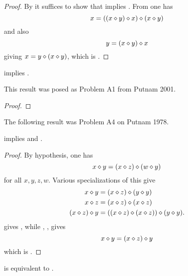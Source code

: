 \begin{proof}\leanok{} By  it suffices to show that  implies .  From  one has
  $$ x = ((x \diamond y) \diamond x) \diamond (x \diamond y)$$
  and also
  $$ y = (x \diamond y) \diamond x$$
  giving $x = y \diamond (x \diamond y)$, which is .
\end{proof}

\begin{theorem}[14 implies 29]\label{14_implies_29} \leanok  {} implies .
\end{theorem}

This result was posed as Problem A1 from Putnam 2001.

\begin{proof}\leanok
\end{proof}

The following result was Problem A4 on Putnam 1978.

\begin{theorem}[3744 implies 3722, 381]\label{3744_implies_3722_381}\leanok {} implies  and .
\end{theorem}

\begin{proof}\leanok By hypothesis, one has
$$x \diamond y = (x \diamond z) \diamond (w \diamond y)
  $$
for all $x,y,z,w$.  Various specializations of this give
\begin{align}
 x \diamond y &= (x \diamond z) \diamond (y \diamond y) \label{381-1} \\
 x \diamond z &= (x \diamond z) \diamond (x \diamond z) \label{381-2} \\
(x \diamond z) \diamond y &= ((x \diamond z) \diamond (x \diamond z)) \diamond (y \diamond y) \label{381-3}.
\end{align}
 gives , while , ,  gives
$$ x \diamond y = (x\diamond z) \diamond y$$
which is .
\end{proof}

\begin{theorem}[1689 is equivalent to 2]\label{1689_equiv_2}\leanok {} is equivalent to .
\end{theorem}


